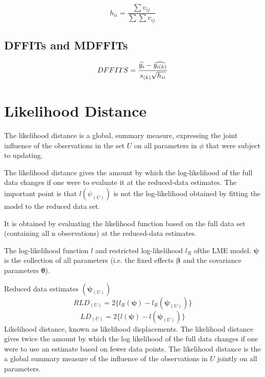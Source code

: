 \documentclass[12pt, a4paper]{report}
\theoremstyle{plain}
\theoremstyle{definition}
\theoremstyle{remark}
\begin{document}
\[ h_{ii} = \frac{\sum v_{ij}}{\sum \sum v_{ij}} \]



\subsection{DFFITs and MDFFITs}

\begin{displaymath} DFFITS = {\widehat{y_i} -
	\widehat{y_{i(k)}} \over s_{(k)} \sqrt{h_{ii}}} \end{displaymath}


\section{Likelihood Distance} %
The  likelihood distance is a global, summary measure, expressing the joint influence of the observations in the set $U$ on all parameters in $\phi$  that were subject to updating. 


The likelihood distance gives the amount by which the log-likelihood of the full data changes if one were
to evaluate it at the reduced-data estimates. The important point is that $l(\psi_{(U)})$ is not the log-likelihood
obtained by fitting the model to the reduced data set.

It is obtained by evaluating the likelihood function based on the full data set (containing all n observations) at the reduced-data estimates.




%
%


The log-likelihood function $l$ and restricted log-likelihood $l_R$ ofthe LME model.
$\boldsymbol{\psi}$ is the collection of all parameters (i.e. the fixed effects $\boldsymbol{\beta}$ and the
covariance parameters $\boldsymbol{\theta}$).

Reduced data estimates $(\boldsymbol{\psi}_{(U)})$
\[  RLD_{(U)}  = 2\{ l_{R}(\boldsymbol{\psi}) - l_{R}(\boldsymbol{\psi}_{(U)}) \} \]
\[  LD_{(U)}  = 2\{ l(\boldsymbol{\psi}) - l(\boldsymbol{\psi}_{(U)}) \} \]
Likelihood distance, known as likelihood displacements.
The likelihood distance gives twice the amount by which the log likelihood of the full data changes if one were to use an estimate based on fewer data points.
The likelihood distance is the a global summary measure of the influence of the observations in $U$ jointly on all parameters.
\end{document}

